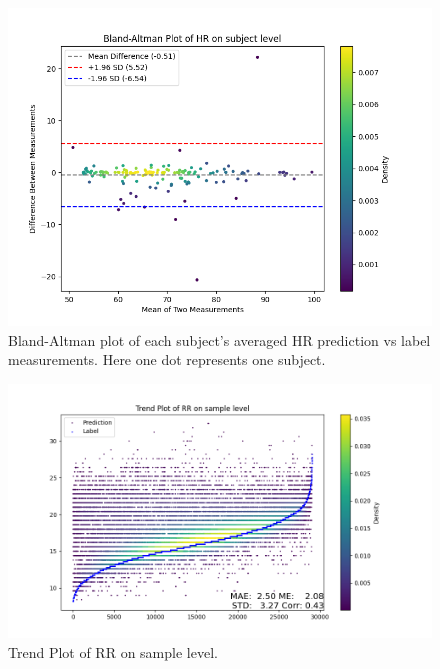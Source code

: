 \documentclass{article}
\begin{document}
\begin{figure}[H]
\centering
\includegraphics[width=\textwidth]{./Fig/Bland_Altman_Plot_HR_on_subject_level.png}
\caption{Bland-Altman plot of each subject's averaged HR prediction vs label measurements. Here one dot represents one subject.}
\label{fig:image1}
\end{figure}

\begin{figure}[H]
\centering
\includegraphics[width=\textwidth]{./Fig/Trend_Plot_RR_on_sample_level.png}
\caption{Trend Plot of RR on sample level.}
\label{fig:image1}
\end{figure}
\end{document}

